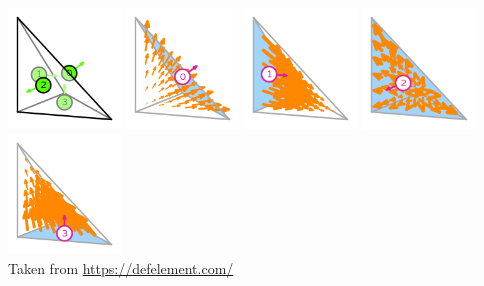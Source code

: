 \begin{center}
\includegraphics[width=3cm]{images/pair_raviart-thomas/element-Raviart-Thomas-variant-equispaced-tetrahedron-1-dofs}
\includegraphics[width=3cm]{images/pair_raviart-thomas/element-Raviart-Thomas-variant-equispaced-tetrahedron-1-0}
\includegraphics[width=3cm]{images/pair_raviart-thomas/element-Raviart-Thomas-variant-equispaced-tetrahedron-1-1}
\includegraphics[width=3cm]{images/pair_raviart-thomas/element-Raviart-Thomas-variant-equispaced-tetrahedron-1-2}
\includegraphics[width=3cm]{images/pair_raviart-thomas/element-Raviart-Thomas-variant-equispaced-tetrahedron-1-3}\\
{\captionfont Taken from \url{https://defelement.com/}}
\end{center}


